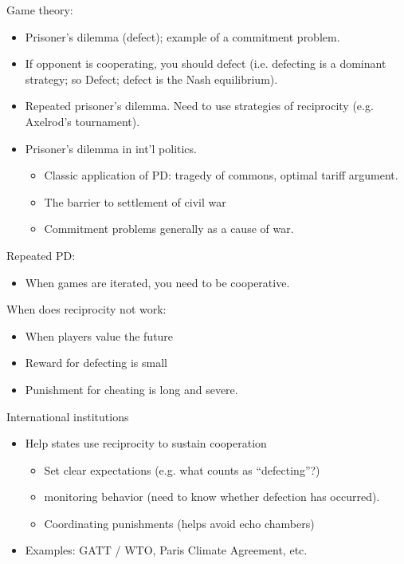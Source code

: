 \documentclass{article}
\begin{document}
Game theory:
\begin{itemize}
  \item Prisoner's dilemma (defect); example of a commitment problem.
  \item If opponent is cooperating, you should defect (i.e. defecting is a dominant strategy; so Defect; defect is the Nash equilibrium).
  \item Repeated prisoner's dilemma.  Need to use strategies of reciprocity (e.g. Axelrod's tournament).
  \item Prisoner's dilemma in int'l politics.
    \begin{itemize}
      \item Classic application of PD: tragedy of commons, optimal tariff argument.
      \item The barrier to settlement of civil war
      \item  Commitment problems generally as a cause of war.
    \end{itemize}
\end{itemize}

Repeated PD:
\begin{itemize}
  \item When games are iterated, you need to be cooperative.
\end{itemize}

When does reciprocity not work:
\begin{itemize}
  \item When players value the future
  \item Reward for defecting is small
  \item Punishment for cheating is long and severe.
\end{itemize}

International institutions
\begin{itemize}
  \item Help states use reciprocity to sustain cooperation
    \begin{itemize}
      \item Set clear expectations (e.g. what counts as ``defecting''?)
      \item monitoring behavior (need to know whether defection has occurred).
      \item Coordinating punishments (helps avoid echo chambers)
    \end{itemize}
  \item Examples: GATT / WTO, Paris Climate Agreement, etc.
\end{itemize}
\end{document}
